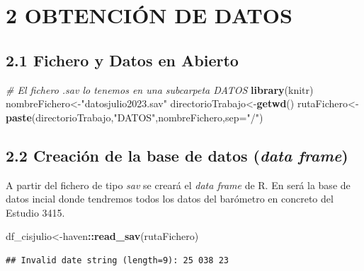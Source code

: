 \documentclass[
]{article}
\newenvironment{Shaded}{\begin{snugshade}}{\end{snugshade}}
\newcommand{\AttributeTok}[1]{\textcolor[rgb]{0.13,0.29,0.53}{#1}}
\newcommand{\CommentTok}[1]{\textcolor[rgb]{0.56,0.35,0.01}{\textit{#1}}}
\newcommand{\FunctionTok}[1]{\textcolor[rgb]{0.13,0.29,0.53}{\textbf{#1}}}
\newcommand{\NormalTok}[1]{#1}
\newcommand{\OtherTok}[1]{\textcolor[rgb]{0.56,0.35,0.01}{#1}}
\newcommand{\SpecialCharTok}[1]{\textcolor[rgb]{0.81,0.36,0.00}{\textbf{#1}}}
\newcommand{\StringTok}[1]{\textcolor[rgb]{0.31,0.60,0.02}{#1}}
\begin{document}
\hypertarget{obtenciuxf3n-de-datos}{%
\section{2 OBTENCIÓN DE DATOS}\label{obtenciuxf3n-de-datos}}

\hypertarget{fichero-y-datos-en-abierto}{%
\subsection{2.1 Fichero y Datos en
Abierto}\label{fichero-y-datos-en-abierto}}

\begin{Shaded}
\begin{Highlighting}[]
\CommentTok{\# El fichero .sav lo tenemos en una subcarpeta DATOS}
\FunctionTok{library}\NormalTok{(knitr)}
\NormalTok{nombreFichero}\OtherTok{\textless{}{-}}\StringTok{"datosjulio2023.sav"}
\NormalTok{directorioTrabajo}\OtherTok{\textless{}{-}}\FunctionTok{getwd}\NormalTok{()}
\NormalTok{rutaFichero}\OtherTok{\textless{}{-}}\FunctionTok{paste}\NormalTok{(directorioTrabajo,}\StringTok{"DATOS"}\NormalTok{,nombreFichero,}\AttributeTok{sep=}\StringTok{"/"}\NormalTok{)}
\end{Highlighting}
\end{Shaded}

\hypertarget{creaciuxf3n-de-la-base-de-datos-data-frame}{%
\subsection{\texorpdfstring{2.2 Creación de la base de datos (\emph{data
frame})}{2.2 Creación de la base de datos (data frame)}}\label{creaciuxf3n-de-la-base-de-datos-data-frame}}

A partir del fichero de tipo \emph{sav} se creará el \emph{data frame}
de R. En será la base de datos incial donde tendremos todos los datos
del barómetro en concreto del Estudio 3415.

\begin{Shaded}
\begin{Highlighting}[]
\NormalTok{df\_cisjulio}\OtherTok{\textless{}{-}}\NormalTok{haven}\SpecialCharTok{::}\FunctionTok{read\_sav}\NormalTok{(rutaFichero)}
\end{Highlighting}
\end{Shaded}

\begin{verbatim}
## Invalid date string (length=9): 25 038 23
\end{verbatim}
\end{document}
